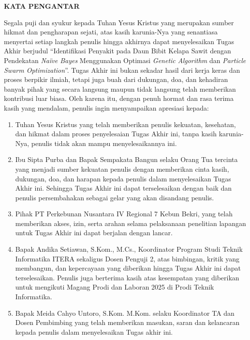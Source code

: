 \clearpage
{}%
\thispagestyle{fancy}

\begin{justifying}
	\large \bfseries \centering \MakeUppercase{Kata Pengantar}
	\par
	\normalsize \normalfont \justifying
	
	Segala puji dan syukur kepada Tuhan Yesus Kristus yang merupakan sumber hikmat dan pengharapan sejati, atas kasih karunia-Nya yang senantiasa menyertai setiap langkah penulis hingga akhirnya dapat menyelesaikan Tugas Akhir berjudul “Identifikasi Penyakit pada Daun Bibit Kelapa Sawit dengan Pendekatan \textit{Naïve Bayes} Menggunakan Optimasi \textit{Genetic Algorithm} dan \textit{Particle Swarm Optimization}”. 
	Tugas Akhir ini bukan sekadar hasil dari kerja keras dan proses berpikir ilmiah, tetapi juga buah dari dukungan, doa, dan kehadiran banyak pihak yang secara langsung maupun tidak langsung telah memberikan kontribusi luar biasa. Oleh karena itu, dengan penuh hormat dan rasa terima kasih yang mendalam, penulis ingin menyampaikan apresiasi kepada:
	\begin{enumerate}[itemsep=1pt, topsep=0pt, parsep=0pt, partopsep=0pt]
		\item {Tuhan Yesus Kristus yang telah memberikan penulis kekuatan, kesehatan, dan hikmat dalam proses penyelesaian Tugas Akhir ini, tanpa kasih karunia-Nya, penulis tidak akan mampu menyelesaikannya ini.}
		\item {Ibu Sipta Purba dan Bapak Sempakata Bangun selaku Orang Tua  tercinta yang menjadi sumber kekuatan penulis dengan memberikan cinta kasih, dukungan, doa, dan harapan kepada penulis dalam menyelesaikan Tugas Akhir ini. Sehingga Tugas Akhir ini dapat terselesaikan dengan baik dan penulis persembahakan sebagai gelar yang akan disandang penulis.}
		\item {Pihak PT Perkebunan Nusantara IV Regional 7 Kebun Bekri, yang telah memberikan akses, izin, serta arahan selama pelaksanaan penelitian lapangan untuk Tugas Akhir ini dapat berjalan dengan lancar.}
		\item {Bapak Andika Setiawan, S.Kom., M.Cs., Koordinator Program Studi Teknik Informatika ITERA sekaligus Dosen Penguji 2, atas bimbingan, kritik yang membangun, dan kepercayaan yang diberikan hingga Tugas Akhir ini dapat terselesaikan. Penulis juga berterima kasih atas kesempatan yang diberikan untuk mengikuti Magang Prodi dan Laboran 2025 di Prodi Teknik Informatika.}
		\item {Bapak Meida Cahyo Untoro, S.Kom. M.Kom. selaku Koordinator TA dan Dosen Pembimbing yang telah memberikan masukan, saran dan kelancaran kepada penulis dalam menyelesaikan Tugas akhir ini.}

\end{enumerate}
\end{justifying}
